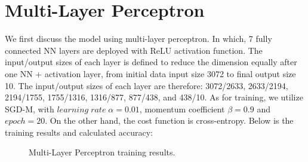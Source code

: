\documentclass[a4paper,12pt]{article}
\begin{document}
\section*{Multi-Layer Perceptron}
\vspace*{-0.4cm}
We first discuss the model using multi-layer perceptron. In which, 7 fully connected NN layers
are deployed with ReLU activation function. 
The input/output sizes of each layer is defined to reduce the dimension equally 
after one NN + activation layer, from initial data input size 3072 to final output size 10. 
The input/output sizes of each layer are therefore:
3072/2633, 2633/2194, 2194/1755, 1755/1316, 1316/877, 877/438, and 438/10.
As for training, we utilize SGD-M, with $learning \; rate \; \alpha=0.01$, momentum coefficient 
$\beta=0.9$ and $epoch=20$.
On the other hand, the cost function is cross-entropy. 
Below is the training results and calculated accuracy:
\vspace*{-0.6cm}
\begin{figure}[!htb]
   \captionsetup[subfigure]{justification=centering}
   \centering
   \hspace{0.5cm}%
   \caption{Multi-Layer Perceptron training results.}
\end{figure}
\vspace*{-0.6cm}
\end{document}
